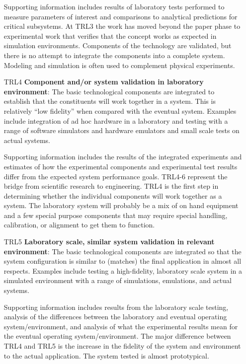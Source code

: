 \documentclass[10pt,twocolumn]{article}
\begin{document}
\begin{enumerate}
    Supporting information includes results of laboratory tests performed to measure parameters of interest and comparisons to analytical predictions for critical subsystems. At TRL3 the work has moved beyond the paper phase to experimental work that verifies that the concept works as expected in simulation environments. Components of the technology are validated, but there is no attempt to integrate the components into a complete system. Modeling and simulation is often used to complement physical experiments.
    
    \item[\footnotesize TRL4] \textbf{Component and/or system validation in laboratory environment}: The basic technological components are integrated to establish that the constituents will work together in a system. This is relatively ``low fidelity'' when compared with the eventual system. Examples include integration of ad hoc hardware in a laboratory and testing with a range of software simulators and hardware emulators and small scale tests on actual systems. 
    
    Supporting information includes the results of the integrated experiments and estimates of how the experimental components and experimental test results differ from the expected system performance goals. TRL4-6 represent the bridge from scientific research to engineering. TRL4 is the first step in determining whether the individual components will work together as a system. The laboratory system will probably be a mix of on hand equipment and a few special purpose components that may require special handling, calibration, or alignment to get them to function.
    
    \item[\footnotesize TRL5] \textbf{Laboratory scale, similar system validation in relevant environment}: The basic technological components are integrated so that the system configuration is similar to (matches) the final application in almost all respects. Examples include testing a high-fidelity, laboratory scale system in a simulated environment with a range of simulations, emulations, and actual systems. 
    
    Supporting information includes results from the laboratory scale testing, analysis of the differences between the laboratory and eventual operating system/environment, and analysis of what the experimental results mean for the eventual operating system/environment. The major difference between TRL4 and TRL5 is the increase in the fidelity of the system and environment to the actual application. The system tested is almost prototypical.
    

\end{enumerate}
\end{document}
